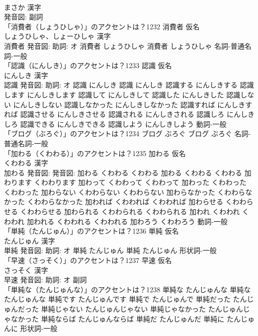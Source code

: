 \documentclass[8pt]{extreport}
\begin{document}
\begin{CJK}{UTF8}{min}
\\	まさか 漢字　
\\	発音図:							副詞 
\\	「消費者（しょうひしゃ）」のアクセントは？1232	消費者 仮名　
\\	しょうひしゃ、しょーひしゃ 漢字　
\\	消費者 発音図: 助詞: オ	消費者 しょうひしゃ		消費者 しょうひしゃ				名詞-普通名詞-一般 
\\	「認識（にんしき）」のアクセントは？1233	認識 仮名　
\\	にんしき 漢字　
\\	認識 発音図: 助詞: オ	認識 にんしき		認識 にんしき 認識する にんしきする 認識します にんしきします 認識して にんしきして 認識した にんしきした 認識しない にんしきしない 認識しなかった にんしきしなかった 認識すれば にんしきすれば 認識させる にんしきさせる 認識される にんしきされる 認識しろ にんしきしろ 認識できる にんしきできる 認識しよう にんしきしよう				動詞-一般 
\\	「ブログ（ぶろぐ）」のアクセントは？1234		ブログ ぶろぐ		ブログ ぶろぐ				名詞-普通名詞-一般 
\\	「加わる（くわわる）」のアクセントは？1235	加わる 仮名　
\\	くわわる 漢字　
\\	加わる 発音図: 発音図:	加わる くわわる くわわる		加わる くわわる くわわる 加わります くわわります 加わって くわわって くわわって 加わった くわわった くわわった 加わらない くわわらない くわわらない 加わらなかった くわわらなかった くわわらなかった 加われば くわわれば くわわれば 加わらせる くわわらせる くわわらせる 加わられる くわわられる くわわられる 加われ くわわれ くわわれ 加われる くわわれる くわわれる 加わろう くわわろう				動詞-一般 
\\	「単純（たんじゅん）」のアクセントは？1236	単純 仮名　
\\	たんじゅん 漢字　
\\	単純 発音図: 助詞: オ	単純 たんじゅん		単純 たんじゅん				形状詞-一般 
\\	「早速（さっそく）」のアクセントは？1237	早速 仮名　
\\	さっそく 漢字　
\\	早速 発音図: 助詞: オ							副詞 
\\	「単純な（たんじゅんな）」のアクセントは？1238		単純な たんじゅんな		単純な たんじゅんな 単純です たんじゅんです 単純で たんじゅんで 単純だった たんじゅんだった 単純じゃない たんじゅんじゃない 単純じゃなかった たんじゅんじゃなかった 単純ならば たんじゅんならば 単純だ たんじゅんだ 単純に たんじゅんに				形状詞-一般 

\end{CJK}
\end{document}
